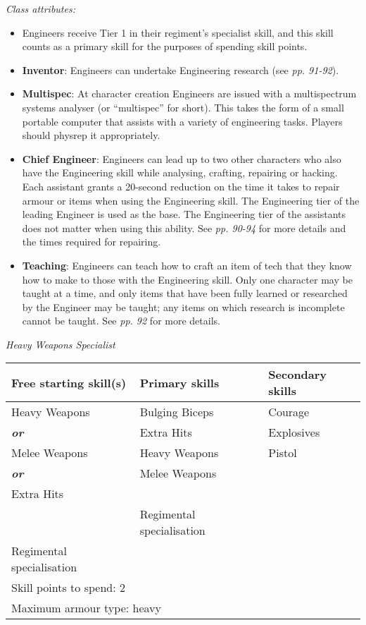 \documentclass{scrbook}
\begin{document}
\textit{Class attributes:}

\begin{itemize}
\item Engineers receive Tier 1 in their regiment's specialist skill, and this skill counts as a primary skill for the purposes of spending skill points.

\item \textbf{Inventor}: Engineers can undertake Engineering research (see \textit{pp. 91-92}).

\item \textbf{Multispec}: At character creation Engineers are issued with a multispectrum systems analyser (or ``multispec'' for short). This takes the form of a small portable computer that assists with a variety of engineering tasks. Players should physrep it appropriately.

\item \textbf{Chief Engineer}: Engineers can lead up to two other characters who also have the Engineering skill while analysing, crafting, repairing or hacking. Each assistant grants a 20-second reduction on the time it takes to repair armour or items when using the Engineering skill. The Engineering tier of the leading Engineer is used as the base. The Engineering tier of the assistants does not matter when using this ability. See \textit{pp. 90-94} for more details and the times required for repairing.

\item \textbf{Teaching}: Engineers can teach how to craft an item of tech that they know how to make to those with the Engineering skill. Only one character may be taught at a time, and only items that have been fully learned or researched by the Engineer may be taught; any items on which research is incomplete cannot be taught. See \textit{pp. 92} for more details.

\end{itemize}
\textit{Heavy Weapons Specialist}

\begin{table}
\begin{tabular}{|l|l|l|} \hline 
Free starting skill(s) & Primary skills & Secondary skills \\
 \hline Heavy Weapons & Bulging Biceps & Courage \\
 \hline \textbf{\textit{or}} & Extra Hits & Explosives \\
 \hline Melee Weapons & Heavy Weapons & Pistol \\
 \hline \textbf{\textit{or}} & Melee Weapons &  \\
 \hline Extra Hits &  &  \\
 \hline  & Regimental specialisation &  \\
 \hline Regimental specialisation &  &  \\
 \hline \multicolumn{3}{|l|}{Skill points to spend: 2} \\
 \hline \multicolumn{3}{|l|}{Maximum armour type: heavy} \\
 \hline \end{tabular}

\end{table}
\end{document}
